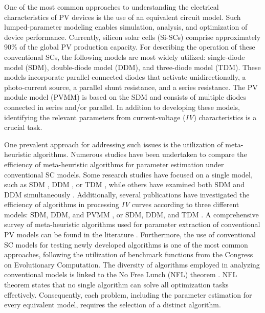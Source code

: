 \documentclass[a4paper,fleqn]{cas-sc}
\begin{document}
One of the most common approaches to understanding the electrical characteristics of PV devices is the use of an equivalent circuit model.
Such lumped-parameter modeling enables simulation, analysis, and optimization of device performance.
Currently, silicon solar cells (Si-SCs) comprise approximately 90\% of the global PV production capacity.
For describing the operation of these conventional SCs, the following models are most widely utilized:
single-diode model (SDM), double-diode model (DDM), and three-diode model (TDM).
These models incorporate
parallel-connected diodes that activate unidirectionally,
a photo-current source, a parallel shunt resistance, and a series resistance.
The PV module model (PVMM) is based on the SDM and consists of multiple diodes connected in series and/or parallel.
In addition to developing these models, identifying the relevant parameters from current-voltage (\emph{IV}) characteristics is a crucial task.

One prevalent approach for addressing such issues is the utilization of meta-heuristic algorithms.
Numerous studies have been undertaken to compare the efficiency of meta-heuristic algorithms for parameter estimation under conventional SC models.
Some research studies have focused on a single model, such as SDM \cite{DE_EM}, DDM \cite{SSA,FWA}, or TDM \cite{ELSHADE_INR},
while others have examined both SDM and DDM simultaneously \cite{ELPSO,Barth2016,BPFPA,MPALW}.
Additionally, several publications have investigated the efficiency of algorithms in processing \emph{IV} curves
according to three different models:
SDM, DDM, and PVMM \cite{IMPA,SCA_NM_OBL,HFAPS,IWOA}, or SDM, DDM, and TDM \cite{Kepler}.
A comprehensive survey of meta-heuristic algorithms used for parameter extraction
of conventional PV models can be found in the literature \cite{Li2021,Yang2020}.
Furthermore, the use of conventional SC models for testing newly developed algorithms
is one of the most common approaches, following the utilization of benchmark functions from the Congress on Evolutionary Computation.
The diversity of algorithms employed in analyzing conventional models is linked to the No Free Lunch (NFL) theorem \cite{NFL}.
NFL theorem states that no single algorithm can solve all optimization tasks effectively.
Consequently, each problem, including the parameter estimation for every equivalent model, requires the selection of a distinct algorithm.
\end{document}
